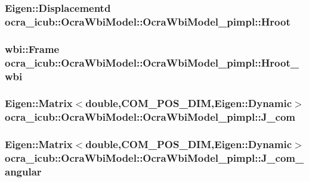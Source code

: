 \hypertarget{structOcraWbiModel_1_1OcraWbiModel__pimpl_a123381dc5b78bd79aed493801e3e6b35}{
\subsubsection[{\-Hroot}]{\setlength{\rightskip}{0pt plus 5cm}\-Eigen\-::\-Displacementd {\bf ocra\-\_\-icub\-::\-Ocra\-Wbi\-Model\-::\-Ocra\-Wbi\-Model\-\_\-pimpl\-::\-Hroot}}}\label{structOcraWbiModel_1_1OcraWbiModel__pimpl_a123381dc5b78bd79aed493801e3e6b35}
\hypertarget{structOcraWbiModel_1_1OcraWbiModel__pimpl_a633b61e128305d5437d8e8c61ae63849}{
\subsubsection[{\-Hroot\-\_\-wbi}]{\setlength{\rightskip}{0pt plus 5cm}wbi\-::\-Frame {\bf ocra\-\_\-icub\-::\-Ocra\-Wbi\-Model\-::\-Ocra\-Wbi\-Model\-\_\-pimpl\-::\-Hroot\-\_\-wbi}}}\label{structOcraWbiModel_1_1OcraWbiModel__pimpl_a633b61e128305d5437d8e8c61ae63849}
\hypertarget{structOcraWbiModel_1_1OcraWbiModel__pimpl_ab724e92a7f74f03c3842f22129b2ad94}{
\subsubsection[{\-J\-\_\-com}]{\setlength{\rightskip}{0pt plus 5cm}\-Eigen\-::\-Matrix$<$double,{\bf \-C\-O\-M\-\_\-\-P\-O\-S\-\_\-\-D\-I\-M},\-Eigen\-::\-Dynamic$>$ {\bf ocra\-\_\-icub\-::\-Ocra\-Wbi\-Model\-::\-Ocra\-Wbi\-Model\-\_\-pimpl\-::\-J\-\_\-com}}}\label{structOcraWbiModel_1_1OcraWbiModel__pimpl_ab724e92a7f74f03c3842f22129b2ad94}
\hypertarget{structOcraWbiModel_1_1OcraWbiModel__pimpl_a1755993b2e425c6a49c55874c6c455e4}{
\subsubsection[{\-J\-\_\-com\-\_\-angular}]{\setlength{\rightskip}{0pt plus 5cm}\-Eigen\-::\-Matrix$<$double,{\bf \-C\-O\-M\-\_\-\-P\-O\-S\-\_\-\-D\-I\-M},\-Eigen\-::\-Dynamic$>$ {\bf ocra\-\_\-icub\-::\-Ocra\-Wbi\-Model\-::\-Ocra\-Wbi\-Model\-\_\-pimpl\-::\-J\-\_\-com\-\_\-angular}}}\label{structOcraWbiModel_1_1OcraWbiModel__pimpl_a1755993b2e425c6a49c55874c6c455e4}
